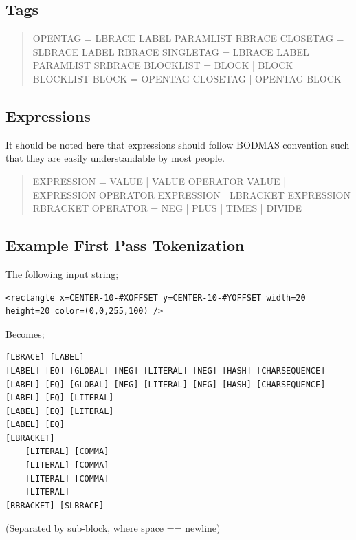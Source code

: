 \documentclass[10pt,a4paper]{article}
\begin{document}
\subsection{Tags}
\begin{quote}
OPENTAG		= LBRACE LABEL PARAMLIST RBRACE\linebreak
CLOSETAG	= SLBRACE LABEL RBRACE\linebreak
SINGLETAG	= LBRACE LABEL PARAMLIST SRBRACE\linebreak
BLOCKLIST	= BLOCK | BLOCK BLOCKLIST\linebreak
BLOCK		= OPENTAG CLOSETAG | OPENTAG BLOCK
\end{quote}

\subsection{Expressions}
It should be noted here that expressions should follow BODMAS convention such that they are easily understandable by most people.

\begin{quote}
EXPRESSION	= VALUE | VALUE OPERATOR VALUE | EXPRESSION OPERATOR EXPRESSION | LBRACKET EXPRESSION RBRACKET\linebreak
OPERATOR	= NEG | PLUS | TIMES | DIVIDE
\end{quote}

\subsection{Example First Pass Tokenization}

The following input string;
\begin{verbatim}
<rectangle x=CENTER-10-#XOFFSET y=CENTER-10-#YOFFSET width=20 height=20 color=(0,0,255,100) />
\end{verbatim}

Becomes;

\begin{verbatim}
[LBRACE] [LABEL]
[LABEL] [EQ] [GLOBAL] [NEG] [LITERAL] [NEG] [HASH] [CHARSEQUENCE]
[LABEL] [EQ] [GLOBAL] [NEG] [LITERAL] [NEG] [HASH] [CHARSEQUENCE]
[LABEL] [EQ] [LITERAL]
[LABEL] [EQ] [LITERAL]
[LABEL] [EQ]
[LBRACKET]
	[LITERAL] [COMMA]
	[LITERAL] [COMMA]
	[LITERAL] [COMMA]
	[LITERAL]
[RBRACKET] [SLBRACE]
\end{verbatim}

(Separated by sub-block, where space == newline)
\end{document}
